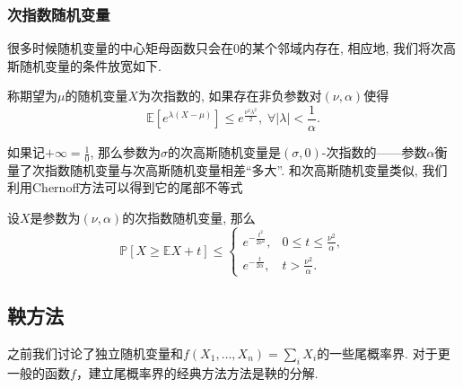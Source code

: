 \subsubsection{次指数随机变量}

很多时候随机变量的中心矩母函数只会在$0$的某个邻域内存在, 相应地, 我们将次高斯随机变量的条件放宽如下. 
\begin{definition}[次指数随机变量]
	称期望为$\mu$的随机变量$X$为次指数的, 如果存在非负参数对$(\nu, \alpha)$使得
	\begin{equation*}
		\mathbb{E}[ e^{\lambda(X - \mu)} ] 
		\leq e^{\frac{\nu^2 \lambda^2}{2}},\; 
		\forall |\lambda| < \frac{1}{\alpha}. 
	\end{equation*}
\end{definition}
\noindent
如果记$+\infty = \frac10$, 那么参数为$\sigma$的次高斯随机变量是$(\sigma, 0)$-次指数的——参数$\alpha$衡量了次指数随机变量与次高斯随机变量相差“多大”. 
和次高斯随机变量类似, 我们利用Chernoff方法可以得到它的尾部不等式

\begin{theorem}[次指数随机变量的上偏差不等式]\label{thm:UpperDeviationOfSubExpRV}
	设$X$是参数为$(\nu, \alpha)$的次指数随机变量, 那么
	\begin{equation*}
		\mathbb{P}[X \geq \mathbb{E}X + t] \leq 
		\begin{cases}
			e^{-\frac{t^2}{2 \nu^2}}, & 0 \leq t \leq \frac{\nu^2}{\alpha}, \\
			e^{-\frac{t}{2 \alpha}}, & t > \frac{\nu^2}{\alpha}.
		\end{cases}
	\end{equation*}
\end{theorem}



\subsection{鞅方法}

之前我们讨论了独立随机变量和$f(X_1, \dots, X_n) = \sum_i X_i$的一些尾概率界. 对于更一般的函数$f$，建立尾概率界的经典方法方法是鞅的分解. 


